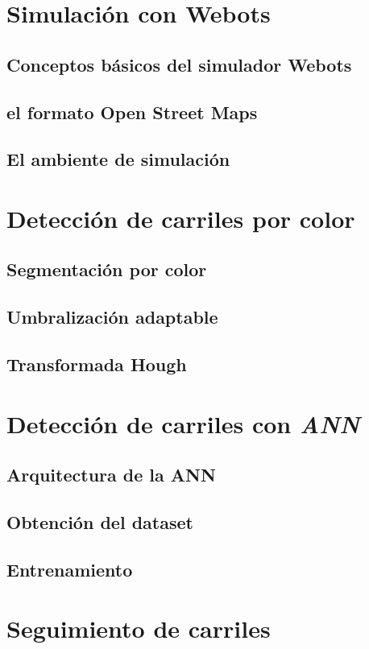 \documentclass{book}
\begin{document}
\chapter{Simulación con Webots}
\section{Conceptos básicos del simulador Webots}
\section{el formato Open Street Maps}
\section{El ambiente de simulación}

\chapter{Detección de carriles por color}
\section{Segmentación por color}
\section{Umbralización adaptable}
\section{Transformada Hough}

\chapter{Detección de carriles con \textit{ANN}}
\section{Arquitectura de la ANN}
\section{Obtención del dataset}
\section{Entrenamiento}

\chapter{Seguimiento de carriles}
\end{document}
